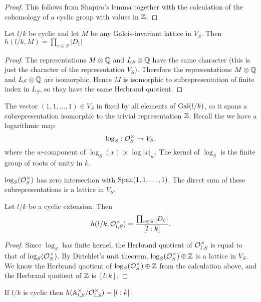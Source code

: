 \begin{proof}
	This follows from Shapiro's lemma together with
	the calculation of the cohomology of a cyclic group with values in ${\mathbb Z}$.
\end{proof}

\begin{lemma}
	Let $l/k$ be cyclic and let $M$ be any Galois-invariant lattice in $V_S$.
	Then $h(l/k,M) = \prod_{v \in S} |D_{\hat v}|$
\end{lemma}

\begin{proof}
	The representations $M \otimes {\mathbb Q}$ and $L_S \otimes {\mathbb Q}$ have the same character
	(this is just the character of the representation $V_S$).
	Therefore the representations $M \otimes {\mathbb Q}$ and $L_S \otimes {\mathbb Q}$ are isomorphic.
	Hence $M$ is isomorphic to subrepresentation of finite index in $L_S$,
	so thay have the same Herbrand quotient.
\end{proof}


The vector $(1,1,\ldots,1) \in V_S$ in fixed by all elements of $\mathrm{Gal}(l/k)$, so it spans
a subrepresentation isomorphic to the trivial representation ${\mathbb Z}$.
Recall the we have a logarithmic map
\[
	\log_S : {\mathcal O}_S^\times \to V_S,
\]
where the $w$-component of $\log_S(x)$ is $\log |x|_w$.
The kernel of $\log_S$ is the finite group of roots of unity in $k$.

\begin{theorem} \label{thm:Dirichlet unit theorem}
	$\log_S({\mathcal O}_S^\times)$ has zero intersection with $\mathrm{Span} (1,1,\ldots,1)$.
	The direct sum of these subrepresentations is a lattice in $V_S$.
\end{theorem}

\begin{corollary}
	Let $l/k$ be a cyclic extension. Then
	\[
		h(l/k,{\mathcal O}_{l,S}^\times) = \frac{\prod_{v\in S} |D_{\hat v}|}{[l:k]}.
	\]
\end{corollary}

\begin{proof}
	Since $\log_S$ has finite kernel, the Herbrand quotient of ${\mathcal O}_{l,S}^\times$ is
	equal to that of $\log_S({\mathcal O}_S^\times)$.
	By Dirichlet's unit theorem, $\log_S({\mathcal O}_S^\times) \oplus {\mathbb Z}$ is a lattice in
	$V_S$.
	We know the Herbrand quotient of $\log_S({\mathcal O}_S^\times) \oplus {\mathbb Z}$ from the calculation above,
	and the Herbrand quotient of ${\mathbb Z}$ is $[l:k]$.
\end{proof}

\begin{corollary}
	If $l/k$ is cyclic then $h({\mathbb A}_{l,S}^\times / {\mathcal O}_{l,S}^\times) = [l:k]$.
\end{corollary}




